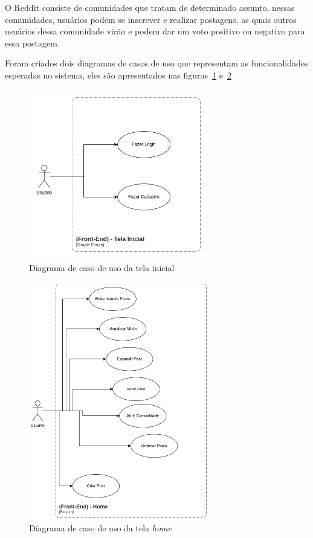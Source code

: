 \documentclass[12pt]{article}
\begin{document}
O Reddit consiste de comunidades que tratam de determinado assunto, nessas comunidades, usuários
podem se inscrever e realizar postagens, as quais outros usuários dessa comunidade virão e podem
dar um voto positivo ou negativo para essa postagem.

Foram criados dois diagramas de casos de uso que representam as funcionalidades esperadas no sistema,
eles são apresentados nas figuras~\ref{fig:welcome_diagram} e~\ref{fig:home_diagram}


\begin{figure}[H]
    \centering
    \includegraphics[width=0.7\textwidth]{diagrams/welcome_diagram.png}
    \caption{Diagrama de caso de uso da tela inicial}\label{fig:welcome_diagram}
\end{figure}

\begin{figure}[H]
    \centering
    \includegraphics[width=0.7\textwidth]{diagrams/home_diagram.png}
    \caption{Diagrama de caso de uso da tela \textit{home}}\label{fig:home_diagram}
\end{figure}
\end{document}
